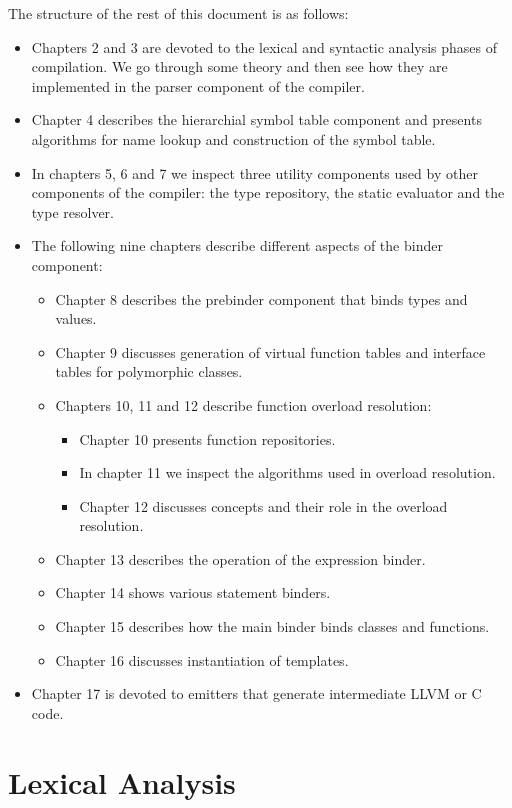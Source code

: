 \documentclass[a4paper,oneside,11pt]{book}
\theoremstyle{definition}
\begin{document}
The structure of the rest of this document is as follows:
\begin{itemize}
\item
Chapters 2 and 3 are devoted to the lexical and syntactic analysis phases of compilation.
We go through some theory and then see how they are implemented in the parser component of the compiler.
\item
Chapter 4 describes the hierarchial symbol table component and presents algorithms for name lookup and construction of the symbol table.
\item
In chapters 5, 6 and 7 we inspect three utility components used by other components of the compiler:
the type repository, the static evaluator and the type resolver.
\item
The following nine chapters describe different aspects of the binder component:
\begin{itemize}
\item
Chapter 8 describes the prebinder component that binds types and values.
\item
Chapter 9 discusses generation of virtual function tables and interface tables for polymorphic classes.
\item
Chapters 10, 11 and 12 describe function overload resolution:
\begin{itemize}
\item
Chapter 10 presents function repositories.
\item
In chapter 11 we inspect the algorithms used in overload resolution.
\item
Chapter 12 discusses concepts and their role in the overload resolution.
\end{itemize}
\item
Chapter 13 describes the operation of the expression binder.
\item
Chapter 14 shows various statement binders.
\item
Chapter 15 describes how the main binder binds classes and functions.
\item
Chapter 16 discusses instantiation of templates.
\end{itemize}
\item
Chapter 17 is devoted to emitters that generate intermediate LLVM or C code.
\end{itemize}

\chapter{Lexical Analysis}
\end{document}
